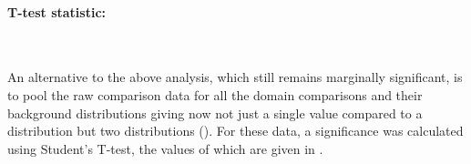 \paragraph{T-test statistic:}\

An alternative to the above analysis, which still remains marginally significant, is to 
pool the raw comparison data for all the domain comparisons and their background distributions
giving now not just a single value compared to a distribution but two distributions ().  
For these data, a significance was calculated using Student's T-test, the values of which are given
in .

%
%
%

